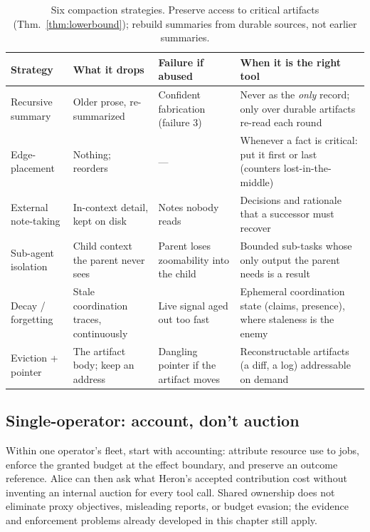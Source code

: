 \documentclass[11pt,a4paper]{article}
\theoremstyle{definition}
\theoremstyle{plain}
\begin{document}
\begin{table}[H]
\centering
\small
\renewcommand{\arraystretch}{1.3}
\begin{tabular}{@{}p{}p{}p{}p{}@{}}
\toprule
\textbf{Strategy} & \textbf{What it drops} & \textbf{Failure if abused} & \textbf{When it is the right tool} \\
\midrule
Recursive summary & Older prose, re-summarized & Confident fabrication (failure 3) & Never as the \emph{only} record; only over durable artifacts re-read each round \\
Edge-placement & Nothing; reorders & --- & Whenever a fact is critical: put it first or last (counters lost-in-the-middle) \\
External note-taking & In-context detail, kept on disk & Notes nobody reads & Decisions and rationale that a successor must recover \\
Sub-agent isolation & Child context the parent never sees & Parent loses zoomability into the child & Bounded sub-tasks whose only output the parent needs is a result \\
Decay / forgetting & Stale coordination traces, continuously & Live signal aged out too fast & Ephemeral coordination state (claims, presence), where staleness is the enemy \\
Eviction + pointer & The artifact body; keep an address & Dangling pointer if the artifact moves & Reconstructable artifacts (a diff, a log) addressable on demand \\
\bottomrule
\end{tabular}
\caption{Six compaction strategies. Preserve access to critical artifacts
(Thm.~\ref{thm:lowerbound}); rebuild summaries from durable sources, not
earlier summaries.}
\label{tab:compaction}
\end{table}

\subsection{Single-operator: account, don't auction}\label{sec:account}

Within one operator's fleet, start with accounting: attribute resource use to
jobs, enforce the granted budget at the effect boundary, and preserve an outcome
reference. Alice can then ask what Heron's accepted contribution cost without
inventing an internal auction for every tool call. Shared ownership does not
eliminate proxy objectives, misleading reports, or budget evasion; the evidence
and enforcement problems already developed in this chapter still apply.
\end{document}
